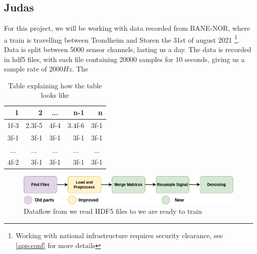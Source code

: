 \subsection{Judas}

For this project, we will be working with data recorded from BANE-NOR, where a train is travelling between Trondheim and Storen the 31st of august 2021 \footnote{Working with national infrastructure requires security clearance, see \ref{app:conf} for more details}. Data is split between 5000 sensor channels, lasting us a day.
The data is recorded in \acrshort{hdf5} files, with each file containing 20000 samples for 10 seconds, giving us a sample rate of $2000Hz$. The


\begin{table}[h]
\centering
\begin{tabular}{|r|r|r|r|r|}
\hline
\textbf{1}                & \textbf{2}               & \multicolumn{1}{c|}{\textbf{...}} & \textbf{n-1}             & \textbf{n}               \\ \hline
1f-3                      & 2.3f-5                   & 4f-4                              & 3.4f-6                   & 3f-1                     \\ \hline
3f-1                      & 3f-1                     & 3f-1                              & 3f-1                     & 3f-1                     \\ \hline
\multicolumn{1}{|c|}{...} & \multicolumn{1}{c|}{...} & \multicolumn{1}{c|}{...}          & \multicolumn{1}{c|}{...} & \multicolumn{1}{c|}{...} \\ \hline
4f-2                      & 3f-1                     & 3f-1                              & 3f-1                     & 3f-1                     \\ \hline
\end{tabular}
\caption{Table explaining how the table looks like}
\label{fig:datatable}
\end{table}



\begin{figure}[h]
    \centering
    \includegraphics{figures/dataflow.png}
    \caption{Dataflow from we read HDF5 files to we are ready to train}
    \label{fig:dataflow}
\end{figure}

